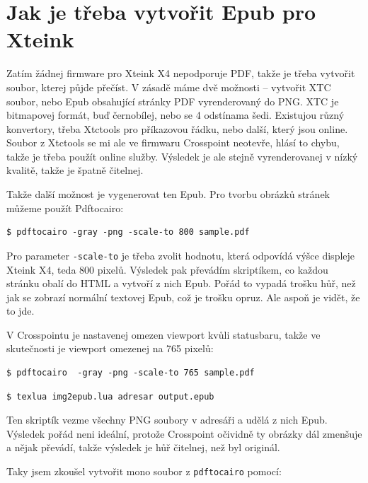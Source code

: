 \documentclass{article}
\begin{document}


\section{Jak je třeba vytvořit Epub pro Xteink}

Zatím žádnej firmware pro Xteink X4 nepodporuje PDF, takže je třeba vytvořit soubor, kterej půjde přečíst.
V zásadě máme dvě možnosti -- vytvořit XTC soubor, nebo Epub obsahující stránky PDF vyrenderovaný do PNG. 
XTC je bitmapovej formát, buď černobílej, nebo se 4 odstínama šedi. Existujou různý konvertory, třeba Xtctools pro 
příkazovou řádku, nebo další, který jsou online. Soubor z Xtctools se mi ale ve firmwaru Crosspoint neotevře,
hlásí to chybu, takže je třeba použít online služby. Výsledek je ale stejně vyrenderovanej v nízký kvalitě, takže 
je špatně čitelnej.

Takže další možnost je vygenerovat ten Epub. Pro tvorbu obrázků stránek můžeme použít Pdftocairo:

\begin{lstlisting}
$ pdftocairo -gray -png -scale-to 800 sample.pdf
\end{lstlisting}

Pro parameter \texttt{-scale-to} je třeba zvolit hodnotu, která odpovídá výšce displeje Xteink X4, teda 800 pixelů.
Výsledek pak převádím skriptíkem, co každou stránku obalí do HTML a vytvoří z nich Epub. Pořád to vypadá trošku hůř,
než jak se zobrazí normální textovej Epub, což je trošku opruz. Ale aspoň je vidět, že to jde.

V Crosspointu je nastavenej omezen viewport kvůli statusbaru, takže ve skutečnosti je viewport omezenej na 765 pixelů:

\begin{lstlisting}
$ pdftocairo  -gray -png -scale-to 765 sample.pdf
\end{lstlisting}


\begin{lstlisting}
$ texlua img2epub.lua adresar output.epub
\end{lstlisting}

Ten skriptík vezme všechny PNG soubory v adresáři a udělá z nich Epub. Výsledek pořád neni ideální, protože Crosspoint očividně
ty obrázky dál zmenšuje a nějak převádí, takže výsledek je hůř čitelnej, než byl originál.

Taky jsem zkoušel vytvořit mono soubor z \texttt{pdftocairo} pomocí:
\end{document}
